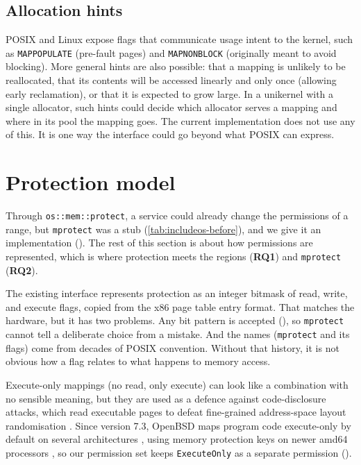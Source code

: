 \documentclass[12pt]{report}
\newcommand{\fullref}[1]{\Cref{#1}}
\renewcommand{\_}{\origunderscore\allowbreak}
\begin{document}
\subsection*{Allocation hints}

POSIX and Linux expose flags that communicate usage intent to the kernel, such as \texttt{MAP\_POPULATE} (pre-fault pages) and \texttt{MAP\_NONBLOCK} (originally meant to avoid blocking). More general hints are also possible: that a mapping is unlikely to be reallocated, that its contents will be accessed linearly and only once (allowing early reclamation), or that it is expected to grow large. In a unikernel with a single allocator, such hints could decide which allocator serves a mapping and where in its pool the mapping goes. The current implementation does not use any of this. It is one way the interface could go beyond what POSIX can express.

\section{Protection model}
\label{sec:protection-model}

Through \texttt{os::mem::protect}, a service could already change the permissions of a range, but \texttt{mprotect} was a stub (\cref{tab:includeos-before}), and we give it an implementation (\fullref{sec:mprotect-impl}). The rest of this section is about how permissions are represented, which is where protection meets the regions (\textbf{RQ1}) and \texttt{mprotect} (\textbf{RQ2}).

The existing interface represents protection as an integer bitmask of read, write, and execute flags, copied from the x86 page table entry format. That matches the hardware, but it has two problems. Any bit pattern is accepted (\fullref{sssec:posix-memory}), so \texttt{mprotect} cannot tell a deliberate choice from a mistake. And the names (\texttt{mprotect} and its flags) come from decades of POSIX convention. Without that history, it is not obvious how a flag relates to what happens to memory access.

Execute-only mappings (no read, only execute) can look like a combination with no sensible meaning, but they are used as a defence against code-disclosure attacks, which read executable pages to defeat fine-grained address-space layout randomisation \cite{werner2016near}. Since version 7.3, OpenBSD maps program code execute-only by default on several architectures \cite{openbsd73}, using memory protection keys on newer amd64 processors \cite{bluhm2023mitigations}, so our permission set keeps \texttt{ExecuteOnly} as a separate permission ().
\end{document}
